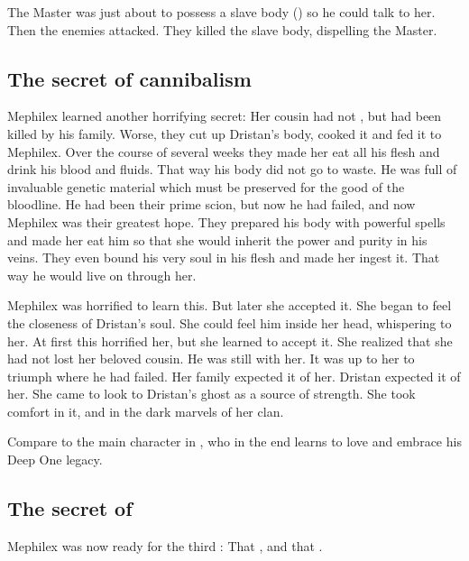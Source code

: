 The Master was just about to possess a slave body () so he could talk to her.
Then the enemies attacked. 
They killed the slave body, dispelling the Master. 










\subsection{The secret of cannibalism}
Mephilex learned another horrifying secret: 
Her cousin  had not , but had been killed by his family. 
Worse, they cut up Dristan's body, cooked it and fed it to Mephilex. 
Over the course of several weeks they made her eat all his flesh and drink his blood and fluids. 
That way his body did not go to waste. 
He was full of invaluable genetic material which must be preserved for the good of the bloodline.
He had been their prime scion, but now he had failed, and now Mephilex was their greatest hope.
They prepared his body with powerful spells and made her eat him so that she would inherit the power and purity in his veins. 
They even bound his very soul in his flesh and made her ingest it. 
That way he would live on through her. 

Mephilex was horrified to learn this. 
But later she accepted it.
She began to feel the closeness of Dristan's soul.
She could feel him inside her head, whispering to her.
At first this horrified her, but she learned to accept it.
She realized that she had not lost her beloved cousin.
He was still with her.
It was up to her to triumph where he had failed.
Her family expected it of her.
Dristan expected it of her.
She came to look to Dristan's ghost as a source of strength. 
She took comfort in it, and in the dark marvels of her clan. 

Compare to the main character in \cite{HPLovecraft:TheShadowOverInnsmouth}, who in the end learns to love and embrace his Deep One legacy.









\subsection{The secret of \Ubloth}
Mephilex was now ready for the third \arcanum: 
That , and that . 

